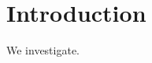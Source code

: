 \documentclass{numapde-preprint}
\begin{document}
\maketitle

\section{Introduction}
We investigate.
\end{document}
